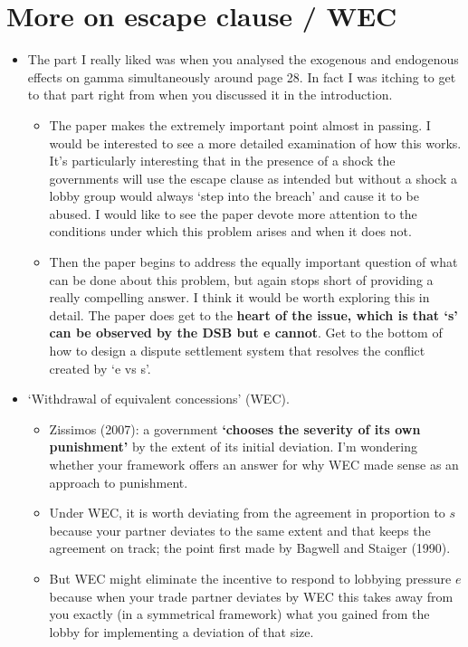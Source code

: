 \documentclass[12pt]{article}
\begin{document}
\newpage
\section{More on escape clause / WEC}
		\begin{itemize}
			\item The part I really liked was when you analysed the exogenous and endogenous effects on gamma simultaneously around page 28.  In fact I was itching to get to that part right from when you discussed it in the introduction.  
				\begin{itemize}
					\item The paper makes the extremely important point almost in passing.  I would be interested to see a more detailed examination of how this works.  It's particularly interesting that in the presence of a shock the governments will use the escape clause as intended but without a shock a lobby group would always `step into the breach' and cause it to be abused.  I would like to see the paper devote more attention to the conditions under which this problem arises and when it does not.
					\item Then the paper begins to address the equally important question of what can be done about this problem, but again stops short of providing a really compelling answer.  I think it would be worth exploring this in detail.  The paper does get to the \textbf{heart of the issue, which is that `s' can be observed by the DSB but e cannot}.  Get to the bottom of how to design a dispute settlement system that resolves the conflict created by `e vs s'.
				\end{itemize}
			\item `Withdrawal of equivalent concessions' (WEC).
				\begin{itemize}
					\item Zissimos (2007): a government \textbf{`chooses the severity of its own punishment'} by the extent of its initial deviation. I'm wondering whether your framework offers an answer for why WEC made sense as an approach to punishment.
					\item Under WEC, it is worth deviating from the agreement in proportion to $s$ because your partner deviates to the same extent and that keeps the agreement on track; the point first made by Bagwell and Staiger (1990).
					\item But WEC might eliminate the incentive to respond to lobbying pressure $e$ because when your trade partner deviates by WEC this takes away from you exactly (in a symmetrical framework) what you gained from the lobby for implementing a deviation of that size.

\end{itemize}
\end{itemize}
\end{document}
